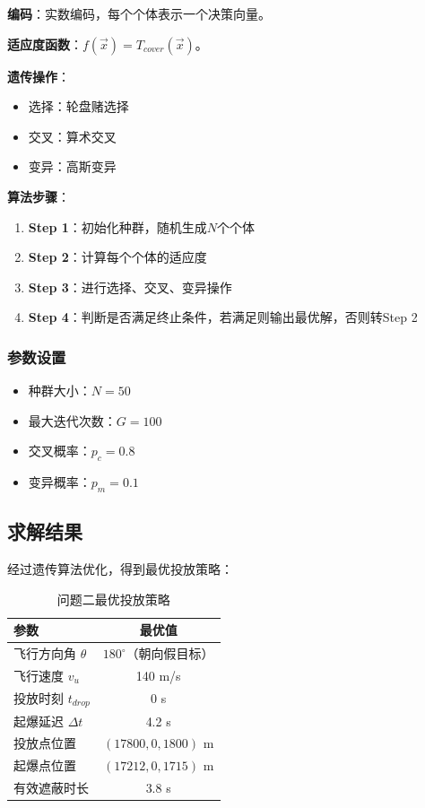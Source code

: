 \documentclass[12pt,a4paper]{article}
\begin{document}
\textbf{编码}：实数编码，每个个体表示一个决策向量。

\textbf{适应度函数}：$f(\vec{x}) = T_{cover}(\vec{x})$。

\textbf{遗传操作}：
\begin{itemize}
    \item 选择：轮盘赌选择
    \item 交叉：算术交叉
    \item 变异：高斯变异
\end{itemize}

\textbf{算法步骤}：
\begin{enumerate}
    \item \textbf{Step 1}：初始化种群，随机生成$N$个个体
    \item \textbf{Step 2}：计算每个个体的适应度
    \item \textbf{Step 3}：进行选择、交叉、变异操作
    \item \textbf{Step 4}：判断是否满足终止条件，若满足则输出最优解，否则转Step 2
\end{enumerate}

\subsubsection{参数设置}

\begin{itemize}
    \item 种群大小：$N = 50$
    \item 最大迭代次数：$G = 100$
    \item 交叉概率：$p_c = 0.8$
    \item 变异概率：$p_m = 0.1$
\end{itemize}

\subsection{求解结果}

经过遗传算法优化，得到最优投放策略：

\begin{table}[H]
\centering
\caption{问题二最优投放策略}
\label{tab:result2}
\begin{tabular}{lc}
\toprule
参数 & 最优值 \\
\midrule
飞行方向角 $\theta$ & $180^\circ$（朝向假目标） \\
飞行速度 $v_u$ & 140 m/s \\
投放时刻 $t_{drop}$ & 0 s \\
起爆延迟 $\Delta t$ & 4.2 s \\
\midrule
投放点位置 & $(17800, 0, 1800)$ m \\
起爆点位置 & $(17212, 0, 1715)$ m \\
有效遮蔽时长 & 3.8 s \\
\bottomrule
\end{tabular}
\end{table}
\end{document}
